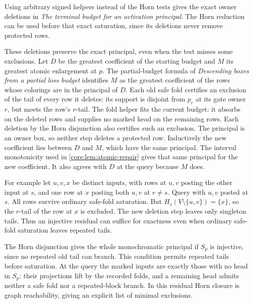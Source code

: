 Using arbitrary signed helpers instead of the Horn
tests gives the exact owner deletions in
\emph{The terminal budget for an activation principal}.
The Horn reduction can be used before that exact
saturation, since its deletions never remove
protected rows.

These deletions preserve the exact principal, even when
the test misses some exclusions. Let $D$ be the greatest
coefficient of the starting budget and $M$ its greatest
atomic enlargement at $p$. The partial-budget formula
of \emph{Descending boxes from a partial loss budget}
identifies $M$ as the greatest coefficient of the rows
whose colorings are in the principal of $D$. Each old
safe fold certifies an exclusion of the tail of every
row it deletes: its support is disjoint from $p_r$ at
its gate owner $r$, but meets the row's $r$-tail. The
fold helper fits the current budget: it absorbs on
the deleted rows and supplies no marked head on the
remaining rows. Each deletion by the Horn
disjunction also certifies such an exclusion. The
principal is an owner box, so neither step deletes a
protected row. Inductively the new coefficient lies
between $D$ and $M$, which have the same principal.
The interval monotonicity used in
\cref{core:lem:atomic-repair} gives that same principal
for the new coefficient. It also agrees with $D$ at
the query because $M$ does.

For example let $u,v,x$ be distinct inputs, with rows
at $u,v$ posting the other input at $s$, and one row
at $x$ posting both $u,v$ at $r\ne s$. Query with
$u,v$ posted at $s$. All rows survive ordinary safe-fold
saturation. But $H_s(V\setminus\{u,v\})=\{x\}$, so the
$r$-tail of the row at $x$ is excluded. The new deletion
step leaves only singleton tails. Thus an injective
residual can suffice for exactness even when ordinary
safe-fold saturation leaves repeated tails.

The Horn disjunction gives the whole monochromatic
principal if $S_p$ is injective, since no repeated
old tail can branch. This condition permits repeated
tails before saturation. At the query the marked
inputs are exactly those with no head in $S_p$:
their projections lift by the recorded folds, and
a remaining head admits neither a safe fold nor a
repeated-block branch. In this residual Horn closure
is graph reachability, giving an explicit list of
minimal exclusions.

